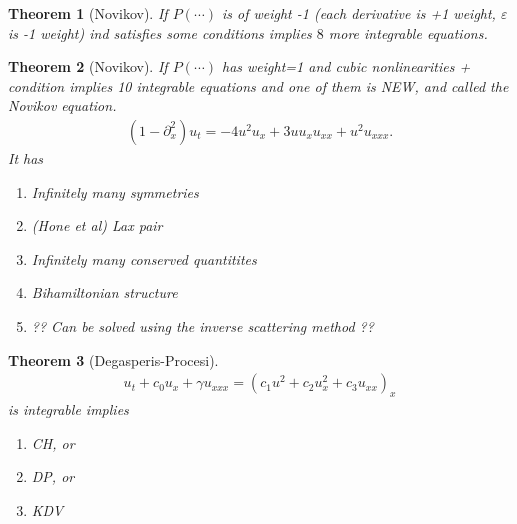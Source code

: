 \documentclass[12pt,reqno]{amsart}
\numberwithin{equation}{section}  %
\newcommand{\p}{\partial}
\newcommand{\ee}{\varepsilon}
\newtheorem{theorem}{Theorem}[section]
\begin{document}
%
%
%
%
%
%                
%
%
%
%
\begin{theorem}[Novikov]
If $P(\cdots)$ is of weight -1 (each derivative is +1 weight, $\ee$ is -1 weight)
ind satisfies some conditions implies $8$ more integrable equations.
\end{theorem}
%
%
%
%
%
%
%                
%
%
%
%
\begin{theorem}[Novikov]
If $P(\cdots)$ has weight=1 and cubic nonlinearities + condition
implies 10 integrable equations and one of them is NEW, and called the Novikov
equation.
%
%
\begin{equation*}
\begin{split}
  (1 - \p_{x}^{2})u_{t} = -4u^{2} u_{x} + 3 u u_{x} u_{xx} + u^{2} u_{xxx}. 
\end{split}
\end{equation*}
%
It has 
\begin{enumerate}
 \item{ Infinitely many symmetries}
 \item{ (Hone et al) Lax pair}
 \item{ Infinitely many conserved quantitites}
 \item{ Bihamiltonian structure}
 \item{ ?? Can be solved using the inverse scattering method ?? }
\end{enumerate}
%
\end{theorem}
%
%
%
%
%
%                
%
%
%
%
\begin{theorem}[Degasperis-Procesi]
%
%
\begin{equation*}
\begin{split}
  u_{t} + c_{0} u_{x} + \gamma u_{xxx} = (c_{1} u^{2} + c_{2} u_{x}^{2} +
  c_{3} u_{xx})_{x}
\end{split}
\end{equation*}
%
%
is integrable implies
\begin{enumerate}
 \item{ CH, or}
 \item{ DP, or}
 \item{ KDV}
\end{enumerate}
\end{theorem}
%
%
%
%
\end{document}
